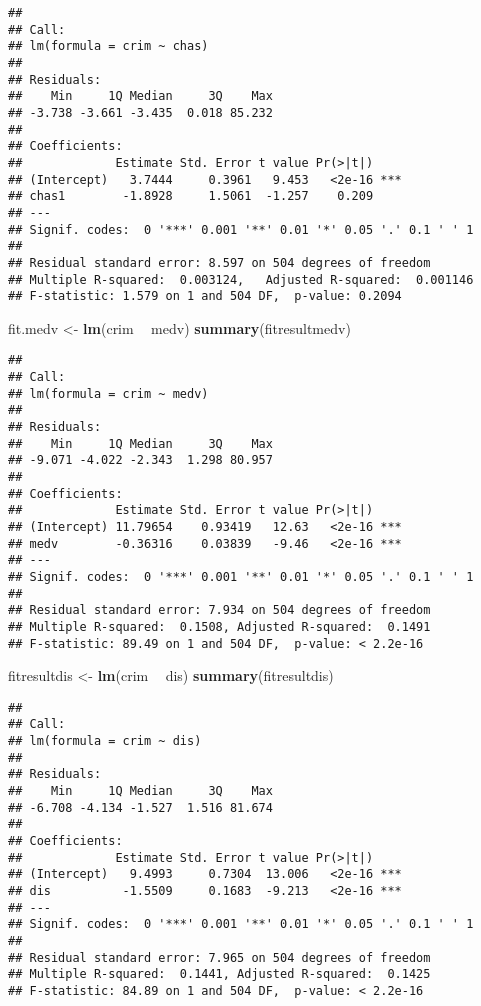 \documentclass[]{article}
\newenvironment{Shaded}{\begin{snugshade}}{\end{snugshade}}
\newcommand{\KeywordTok}[1]{\textcolor[rgb]{0.13,0.29,0.53}{\textbf{#1}}}
\newcommand{\StringTok}[1]{\textcolor[rgb]{0.31,0.60,0.02}{#1}}
\newcommand{\OperatorTok}[1]{\textcolor[rgb]{0.81,0.36,0.00}{\textbf{#1}}}
\newcommand{\NormalTok}[1]{#1}
\begin{document}
\begin{verbatim}
## 
## Call:
## lm(formula = crim ~ chas)
## 
## Residuals:
##    Min     1Q Median     3Q    Max 
## -3.738 -3.661 -3.435  0.018 85.232 
## 
## Coefficients:
##             Estimate Std. Error t value Pr(>|t|)    
## (Intercept)   3.7444     0.3961   9.453   <2e-16 ***
## chas1        -1.8928     1.5061  -1.257    0.209    
## ---
## Signif. codes:  0 '***' 0.001 '**' 0.01 '*' 0.05 '.' 0.1 ' ' 1
## 
## Residual standard error: 8.597 on 504 degrees of freedom
## Multiple R-squared:  0.003124,   Adjusted R-squared:  0.001146 
## F-statistic: 1.579 on 1 and 504 DF,  p-value: 0.2094
\end{verbatim}

\begin{Shaded}
\begin{Highlighting}[]
\NormalTok{fit.medv <-}\StringTok{ }\KeywordTok{lm}\NormalTok{(crim }\OperatorTok{~}\StringTok{ }\NormalTok{medv)}
\KeywordTok{summary}\NormalTok{(fitresultmedv)}
\end{Highlighting}
\end{Shaded}

\begin{verbatim}
## 
## Call:
## lm(formula = crim ~ medv)
## 
## Residuals:
##    Min     1Q Median     3Q    Max 
## -9.071 -4.022 -2.343  1.298 80.957 
## 
## Coefficients:
##             Estimate Std. Error t value Pr(>|t|)    
## (Intercept) 11.79654    0.93419   12.63   <2e-16 ***
## medv        -0.36316    0.03839   -9.46   <2e-16 ***
## ---
## Signif. codes:  0 '***' 0.001 '**' 0.01 '*' 0.05 '.' 0.1 ' ' 1
## 
## Residual standard error: 7.934 on 504 degrees of freedom
## Multiple R-squared:  0.1508, Adjusted R-squared:  0.1491 
## F-statistic: 89.49 on 1 and 504 DF,  p-value: < 2.2e-16
\end{verbatim}

\begin{Shaded}
\begin{Highlighting}[]
\NormalTok{fitresultdis <-}\StringTok{ }\KeywordTok{lm}\NormalTok{(crim }\OperatorTok{~}\StringTok{ }\NormalTok{dis)}
\KeywordTok{summary}\NormalTok{(fitresultdis)}
\end{Highlighting}
\end{Shaded}

\begin{verbatim}
## 
## Call:
## lm(formula = crim ~ dis)
## 
## Residuals:
##    Min     1Q Median     3Q    Max 
## -6.708 -4.134 -1.527  1.516 81.674 
## 
## Coefficients:
##             Estimate Std. Error t value Pr(>|t|)    
## (Intercept)   9.4993     0.7304  13.006   <2e-16 ***
## dis          -1.5509     0.1683  -9.213   <2e-16 ***
## ---
## Signif. codes:  0 '***' 0.001 '**' 0.01 '*' 0.05 '.' 0.1 ' ' 1
## 
## Residual standard error: 7.965 on 504 degrees of freedom
## Multiple R-squared:  0.1441, Adjusted R-squared:  0.1425 
## F-statistic: 84.89 on 1 and 504 DF,  p-value: < 2.2e-16
\end{verbatim}
\end{document}
